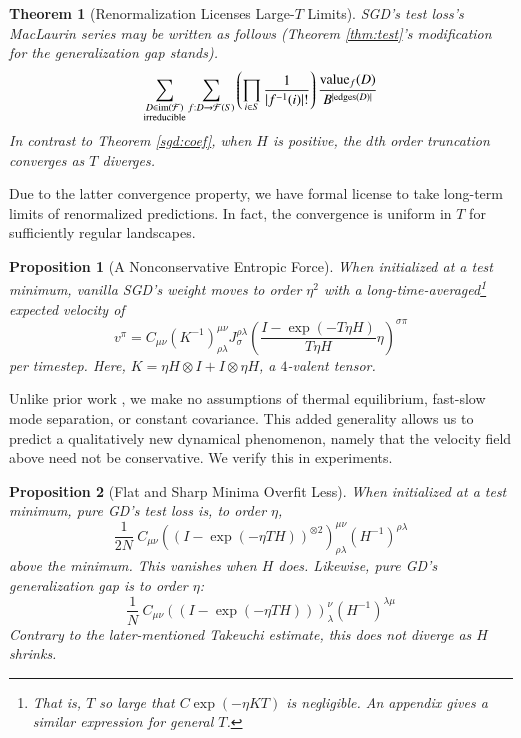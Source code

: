 \documentclass{article}
\newtheorem{thm}{Theorem}
\newtheorem{prop}{Proposition}
\newcommand{\Free}{\mathcal{F}}
\newcommand{\image}{\text{\textnormal{im}}}
\newcommand{\dvalue}{\text{\textnormal{value}}}
\newcommand{\edges}{\text{\textnormal{edges}}}
\newcommand{\wrap}[1]{\left(#1\right)}
\begin{document}
        \begin{thm}[Renormalization Licenses Large-$T$ Limits] \label{thm:renorm}
            SGD's test loss's MacLaurin series may be written as follows
            (Theorem \ref{thm:test}'s modification for the generalization gap
            stands).
            \begin{equation} \label{eq:renorm}
                \sum_{\substack{D \in \image(\Free)\\ \text{irreducible}}}
                \sum_{f: D\to\Free(S)}
                    \left(
                        \prod_{i\in S} \frac{1}{|f^{-1}(i)|!}
                    \right)
                \frac{\dvalue_f(D)}{B^{|\edges(D)|}}
            \end{equation}
            In contrast to Theorem \ref{sgd:coef}, when $H$ is positive,
            the $d$th order truncation converges as $T$ diverges.
        \end{thm}
        Due to the latter convergence property, we have formal license to 
        take long-term limits of renormalized predictions.  In fact, the
        convergence is uniform in $T$ for sufficiently regular landscapes.
        \begin{prop}[A Nonconservative Entropic Force]\label{prop:entropic}
            When initialized at a test minimum, vanilla SGD's weight moves to
            order $\eta^2$ with a long-time-averaged\footnote{
                That is, $T$ so large that $C \exp(-\eta K T)$ is negligible.
                An appendix gives a similar expression for general $T$.
            }
            expected velocity of
            $$
                v^\pi = C_{\mu \nu}
                \wrap{K^{-1}}^{\mu\nu}_{\rho\lambda}
                J^{\rho\lambda}_{\sigma}
                \wrap{\frac{I - \exp(-T \eta H)}{T \eta H} \eta}^{\sigma \pi}
            $$
            per timestep.
            Here, $K = \eta H \otimes I + I \otimes \eta H$, a
            $4$-valent tensor. 
        \end{prop}
        Unlike prior work \cite{we19b}, we make no assumptions of
        thermal equilibrium, fast-slow mode separation, or constant covariance.
        This added generality allows us to predict a qualitatively new
        dynamical phenomenon, namely that the velocity field above need not be
        conservative.  We verify this in experiments.
        \begin{prop}[Flat and Sharp Minima Overfit Less]\label{prop:overfit}
            When initialized at a test minimum, pure GD's test loss is, to
            order $\eta$, 
            $$
                \frac{1}{2N} ~
                    C_{\mu\nu}
                    \wrap{(I - \exp(-\eta T H))^{\otimes 2}}^{\mu\nu}_{\rho\lambda}
                    \wrap{H^{-1}}^{\rho\lambda}
            $$
            above the minimum.  This vanishes when $H$ does. 
            Likewise, pure GD's generalization gap is to order $\eta$:  
            $$
                \frac{1}{N} ~
                    C_{\mu\nu}
                    \wrap{(I - \exp(-\eta T H))}^{\nu}_{\lambda}
                    \wrap{H^{-1}}^{\lambda\mu}
            $$
            Contrary to the later-mentioned Takeuchi estimate, this does not
            diverge as $H$ shrinks.
        \end{prop}
\end{document}
